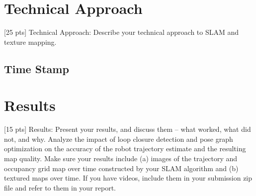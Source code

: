\documentclass[conference]{IEEEtran}
\begin{document}
\section{Technical Approach}
[25 pts] Technical Approach: Describe your technical approach to SLAM and texture mapping.
\subsection{Time Stamp}


\section{Results}
[15 pts] Results: Present your results, and discuss them – what worked, what did not, and why.
Analyze the impact of loop closure detection and pose graph optimization on the accuracy of the robot
trajectory estimate and the resulting map quality. Make sure your results include (a) images of the
trajectory and occupancy grid map over time constructed by your SLAM algorithm and (b) textured
maps over time. If you have videos, include them in your submission zip file and refer to them in your
report.
\end{document}

